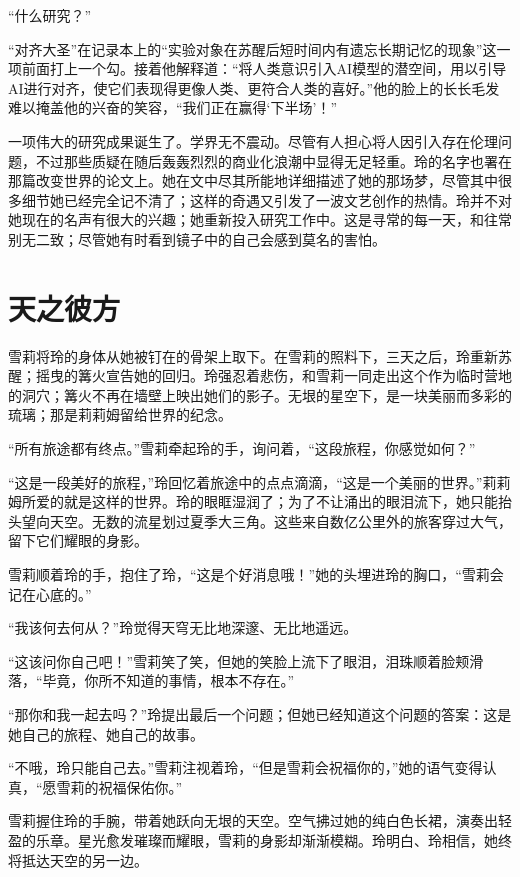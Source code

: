 “什么研究？”

“对齐大圣”在记录本上的“实验对象在苏醒后短时间内有遗忘长期记忆的现象”这一项前面打上一个勾。接着他解释道：“将人类意识引入AI模型的潜空间，用以引导AI进行对齐，使它们表现得更像人类、更符合人类的喜好。”他的脸上的长长毛发难以掩盖他的兴奋的笑容，“我们正在赢得‘下半场’！”

一项伟大的研究成果诞生了。学界无不震动。尽管有人担心将人因引入存在伦理问题，不过那些质疑在随后轰轰烈烈的商业化浪潮中显得无足轻重。玲的名字也署在那篇改变世界的论文上。她在文中尽其所能地详细描述了她的那场梦，尽管其中很多细节她已经完全记不清了；这样的奇遇又引发了一波文艺创作的热情。玲并不对她现在的名声有很大的兴趣；她重新投入研究工作中。这是寻常的每一天，和往常别无二致；尽管她有时看到镜子中的自己会感到莫名的害怕。

\section{ 天之彼方}

雪莉将玲的身体从她被钉在的骨架上取下。在雪莉的照料下，三天之后，玲重新苏醒；摇曳的篝火宣告她的回归。玲强忍着悲伤，和雪莉一同走出这个作为临时营地的洞穴；篝火不再在墙壁上映出她们的影子。无垠的星空下，是一块美丽而多彩的琉璃；那是莉莉姆留给世界的纪念。

“所有旅途都有终点。”雪莉牵起玲的手，询问着，“这段旅程，你感觉如何？”

“这是一段美好的旅程，”玲回忆着旅途中的点点滴滴，“这是一个美丽的世界。”莉莉姆所爱的就是这样的世界。玲的眼眶湿润了；为了不让涌出的眼泪流下，她只能抬头望向天空。无数的流星划过夏季大三角。这些来自数亿公里外的旅客穿过大气，留下它们耀眼的身影。

雪莉顺着玲的手，抱住了玲，“这是个好消息哦！”她的头埋进玲的胸口，“雪莉会记在心底的。”

“我该何去何从？”玲觉得天穹无比地深邃、无比地遥远。

“这该问你自己吧！”雪莉笑了笑，但她的笑脸上流下了眼泪，泪珠顺着脸颊滑落，“毕竟，你所不知道的事情，根本不存在。”

“那你和我一起去吗？”玲提出最后一个问题；但她已经知道这个问题的答案：这是她自己的旅程、她自己的故事。

“不哦，玲只能自己去。”雪莉注视着玲，“但是雪莉会祝福你的，”她的语气变得认真，“愿雪莉的祝福保佑你。”

雪莉握住玲的手腕，带着她跃向无垠的天空。空气拂过她的纯白色长裙，演奏出轻盈的乐章。星光愈发璀璨而耀眼，雪莉的身影却渐渐模糊。玲明白、玲相信，她终将抵达天空的另一边。
